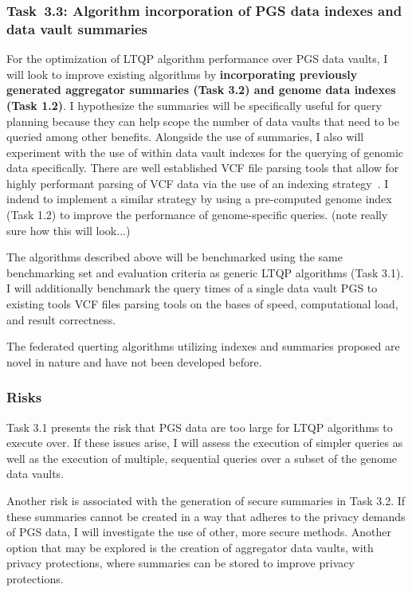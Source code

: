 \documentclass[a4paper,11pt]{article}
\begin{document}
\begin{refsection}
\newcommand\WPcc{Algorithm incorporation of PGS data indexes and data vault summaries}
\subsubsection{Task~3.3: \WPcc}

For the optimization of LTQP algorithm performance over PGS data vaults, I will look to improve existing algorithms by \textbf{incorporating previously generated aggregator summaries (Task 3.2) and genome data indexes (Task 1.2)}.
I hypothesize the summaries will be specifically useful for query planning because they can help scope the number of data vaults that need to be queried among other benefits. 
Alongside the use of summaries, I also will experiment with the use of within data vault indexes for the querying of genomic data specifically. 
There are well established VCF file parsing tools that allow for highly performant parsing of VCF data via the use of an indexing strategy~\cite{yang_seqminer2_2020}. 
I indend to implement a similar strategy by using a pre-computed genome index (Task 1.2) to improve the performance of genome-specific queries. 
(note really sure how this will look...)

The algorithms described above will be benchmarked using the same benchmarking set and evaluation criteria as generic LTQP algorithms (Task 3.1). 
I will additionally benchmark the query times of a single data vault PGS to existing tools VCF files parsing tools on the bases of speed, computational load, and result correctness.

The federated querting algorithms utilizing indexes and summaries proposed are novel in nature and have not been developed before. 

\subsubsection{Risks}
Task 3.1 presents the risk that PGS data are too large for LTQP algorithms to execute over. 
If these issues arise, I will assess the execution of simpler queries as well as the execution of multiple, sequential queries over a subset of the genome data vaults.

Another risk is associated with the generation of secure summaries in Task 3.2. 
If these summaries cannot be created in a way that adheres to the privacy demands of PGS data, I will investigate the use of other, more secure methods.
Another option that may be explored is the creation of aggregator data vaults, with privacy protections, where summaries can be stored to improve privacy protections.


\end{refsection}
\end{document}
